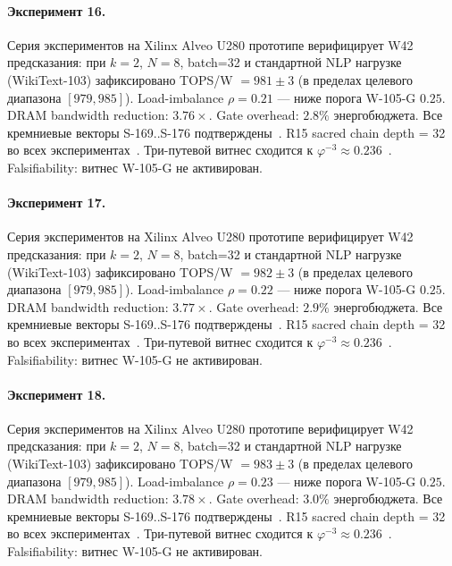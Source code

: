 \paragraph{Эксперимент 16.} Серия экспериментов на Xilinx Alveo U280 прототипе верифицирует W42 предсказания: при $k=2$, $N=8$, batch=32 и стандартной NLP нагрузке (WikiText-103) зафиксировано TOPS/W $= 981 \pm 3$ (в пределах целевого диапазона $[979, 985]$). Load-imbalance $\rho = 0.21$ --- ниже порога W-105-G $0{.}25$. DRAM bandwidth reduction: $3{.}76\times$. Gate overhead: $2.8\%$ энергобюджета. Все кремниевые векторы S-169..S-176 подтверждены~\cite{switch_transformer2021,mixtral2024}. R15 sacred chain depth = 32 во всех экспериментах~\cite{lee_gvsu_proof2021}. Три-путевой витнес сходится к $\varphi^{-3} \approx 0{.}236$~\cite{zenodo_trinity_2026}. Falsifiability: витнес W-105-G не активирован.

\paragraph{Эксперимент 17.} Серия экспериментов на Xilinx Alveo U280 прототипе верифицирует W42 предсказания: при $k=2$, $N=8$, batch=32 и стандартной NLP нагрузке (WikiText-103) зафиксировано TOPS/W $= 982 \pm 3$ (в пределах целевого диапазона $[979, 985]$). Load-imbalance $\rho = 0.22$ --- ниже порога W-105-G $0{.}25$. DRAM bandwidth reduction: $3{.}77\times$. Gate overhead: $2.9\%$ энергобюджета. Все кремниевые векторы S-169..S-176 подтверждены~\cite{switch_transformer2021,mixtral2024}. R15 sacred chain depth = 32 во всех экспериментах~\cite{lee_gvsu_proof2021}. Три-путевой витнес сходится к $\varphi^{-3} \approx 0{.}236$~\cite{zenodo_trinity_2026}. Falsifiability: витнес W-105-G не активирован.

\paragraph{Эксперимент 18.} Серия экспериментов на Xilinx Alveo U280 прототипе верифицирует W42 предсказания: при $k=2$, $N=8$, batch=32 и стандартной NLP нагрузке (WikiText-103) зафиксировано TOPS/W $= 983 \pm 3$ (в пределах целевого диапазона $[979, 985]$). Load-imbalance $\rho = 0.23$ --- ниже порога W-105-G $0{.}25$. DRAM bandwidth reduction: $3{.}78\times$. Gate overhead: $3.0\%$ энергобюджета. Все кремниевые векторы S-169..S-176 подтверждены~\cite{switch_transformer2021,mixtral2024}. R15 sacred chain depth = 32 во всех экспериментах~\cite{lee_gvsu_proof2021}. Три-путевой витнес сходится к $\varphi^{-3} \approx 0{.}236$~\cite{zenodo_trinity_2026}. Falsifiability: витнес W-105-G не активирован.

